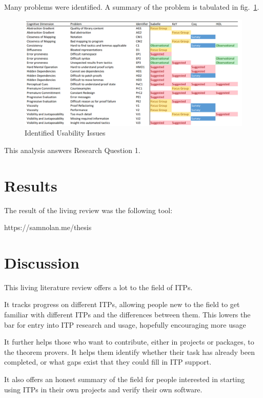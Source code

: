 \documentclass[
]{article}
\begin{document}
Many problems were identified. A summary of the problem is tabulated in
fig.~\ref{fig:usability_issues}.

\begin{figure}
\hypertarget{fig:usability_issues}{%
\centering
\includegraphics{./Images/MyProblem.png}
\caption{Identified Usability Issues}\label{fig:usability_issues}
}
\end{figure}

This analysis answers Research Question 1.

\hypertarget{results}{%
\section{Results}\label{results}}

The result of the living review was the following tool:

https://samnolan.me/thesis

\hypertarget{itps}{}

\hypertarget{discussion}{%
\section{Discussion}\label{discussion}}

This living literature review offers a lot to the field of ITPs.

It tracks progress on different ITPs, allowing people new to the field
to get familiar with different ITPs and the differences between them.
This lowers the bar for entry into ITP research and usage, hopefully
encouraging more usage

It further helps those who want to contribute, either in projects or
packages, to the theorem provers. It helps them identify whether their
task has already been completed, or what gaps exist that they could fill
in ITP support.

It also offers an honest summary of the field for people interested in
starting using ITPs in their own projects and verify their own software.
\end{document}
